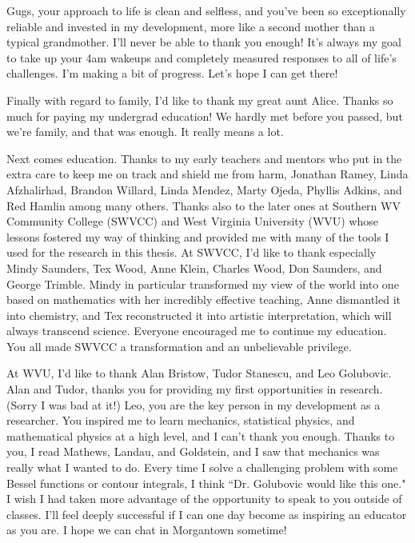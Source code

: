 Gugs, your approach to life is clean and selfless, and you've been so exceptionally reliable and invested in my development, more like a second mother than a typical grandmother. I'll never be able to thank you enough!
It's always my goal to take up your 4am wakeups and completely measured responses to all of life's challenges. I'm making a bit of progress. Let's hope I can get there!

Finally with regard to family, I'd like to thank my great aunt Alice. Thanks so much for paying my undergrad education! We hardly met before you passed, but we're family, and that was enough. It really means a lot.

Next comes education. Thanks to my early teachers and mentors who put in the extra care to keep me on track and shield me from harm, Jonathan Ramey, Linda Afzhalirhad, Brandon Willard, Linda Mendez, Marty Ojeda, Phyllis Adkins, and Red Hamlin among many others.
Thanks also to the later ones at Southern WV Community College (SWVCC) and West Virginia University (WVU) whose lessons fostered my way of thinking and provided me with many of the tools I used for the research in this thesis.
At SWVCC, I'd like to thank especially Mindy Saunders, Tex Wood, Anne Klein, Charles Wood, Don Saunders, and George Trimble. Mindy in particular transformed my view of the world into one based on mathematics with her incredibly effective teaching, Anne dismantled it into chemistry, and Tex reconstructed it into artistic interpretation, which will always transcend science. Everyone encouraged me to continue my education. You all made SWVCC a transformation and an unbelievable privilege.

At WVU, I'd like to thank Alan Bristow, Tudor Stanescu, and Leo Golubovic. Alan and Tudor, thanks you for providing my first opportunities in research. (Sorry I was bad at it!) Leo, you are the key person in my development as a researcher. You inspired me to learn mechanics, statistical physics, and mathematical physics at a high level, and I can't thank you enough. Thanks to you, I read Mathews, Landau, and Goldstein, and I saw that mechanics was really what I wanted to do. Every time I solve a challenging problem with some Bessel functions or contour integrals, I think ``Dr. Golubovic would like this one." I wish I had taken more advantage of the opportunity to speak to you outside of classes. I'll feel deeply successful if I can one day become as inspiring an educator as you are. I hope we can chat in Morgantown sometime!

